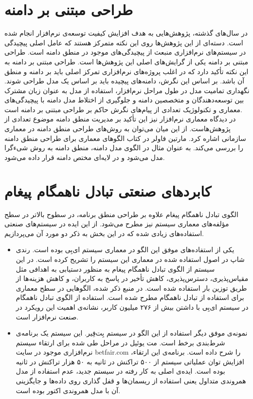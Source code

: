 \section{طراحی مبتنی بر دامنه}
در سال‌های گذشته، پژوهش‌هایی به هدف افزایش کیفیت توسعه‌ی نرم‌افزار انجام شده است. دسته‌ای از این پژوهش‌ها روی این نکته متمرکز هستند که عامل اصلی پیچیدگی‌ در سیستم‌های نرم‌افزاری منبعث از پیچیدگی‌های موجود در منطق دامنه است. طراحی مبتنی بر دامنه\cite{DDD-2003} یکی از گرایش‌های اصلی این پژوهش‌ها است.  طراحی مبتنی بر دامنه به این نکته تأکید دارد که در اغلب پروژه‌های نرم‌افزاری تمرکز اصلی باید بر دامنه و منطق آن باشد. بر اساس این نگرش، دامنه‌های پیچیده باید بر اساس یک مدل طراحی شوند. نگهداری تمامیت مدل در طول مراحل نرم‌افزار، استفاده از مدل به عنوان زبان مشترک بین توسعه‌دهندگان و متخصصین دامنه و جلوگیری از اختلاط مدل دامنه با پیچیدگی‌های معماری و تکنولوژیک تعدادی از پیام‌های نگرش حاکم بر طراحی مبتنی بر دامنه است. \\
در دیدگاه معماری نرم‌افزار نیز این تأکید بر مدیریت منطق دامنه موضوع تعدادی از پژوهش‌هاست. از این میان می‌توان به روش‌های طراحی منطق دامنه در معماری سازمانی اشاره کرد. مارتین فاولر در کتاب \cite{Fowler_Patterns} الگوهای معماری برای طراحی منطق دامنه را بررسی می‌کند. به عنوان مثال در الگوی مدل دامنه\cite{Fowler_Patterns}، منطق دامنه به روش شیءگرا مدل می‌شود و در لایه‌ای مختص دامنه قرار داده می‌شود. 

\section{کابردهای صنعتی تبادل ناهمگام پیغام}
الگوی تبادل ناهمگام پیغام علاوه بر طراحی منطق برنامه، در سطوح بالاتر در سطح مؤلفه‌های معماری سیستم نیز مطرح می‌شود. از این ایده در سیستم‌های صنعتی استفاده‌های زیادی شده که در این بخش به ذکر دو مورد آن می‌پردازیم.
\begin{itemize}
\item یکی از استفاده‌های موفق این الگو در معماری سیستم ای‌بِی بوده است. رندی شاپ در \cite{Shoup08theebay} اصول استفاده شده در معماری این سیستم را تشریح کرده است. در این سیستم از الگوی تبادل ناهمگام پیغام به منظور دستیابی به اهدافی مثل
\gls{مقیاس‌پذیری}، \gls{دسترس‌پذیری}، کاهش تأخیر در پاسخ به کاربران،  و کاهش هزینه‌ها از طریق توزین بار استفاده شده است. در منبع ذکر شده، الگوهایی در سطح معماری برای استفاده از تبادل ناهمگام مطرح شده است. استفاده از الگوی تبادل ناهمگام در سیستم ای‌بِی با داشتن بیش از ۲۷۶ میلیون کاربر، نشانه‌ی اهمیت این رویکرد در صنعت نرم‌افزار است.\cite{Shoup08theebay}
\item نمونه‌ی موفق دیگر استفاده از این الگو در سیستم بِت‌فِیر. این سیستم یک برنامه‌ی شرط‌بندی برخط است.
مت یوئیل در \cite{betfair} مراحل ‌طی شده برای ارتقاء سیستم نرم‌افزاری موجود در سایت betfair.com را شرح داده است. برنامه‌ی این ارتقاء، افزایش توان عملیاتی سیستم از ۵۰۰ تراکنش در ثانیه به ۵۰ هزار تراکنش در ثانیه بوده است. ایده‌ی اصلی به کار رفته در سیستم جدید، عدم استفاده از مدل همروندی متداول یعنی استفاده از ریسمان‌ها و قفل گذاری روی داده‌ها و جایگزینی آن با مدل همروندی اکتور بوده است\cite{betfair}.
\end{itemize}